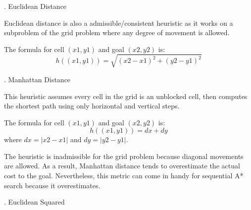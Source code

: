 \documentclass[12pt, letterpaper]{article}
\begin{document}
\bigskip
{}. Euclidean Distance

Euclidean distance is also a admissible/consistent heuristic as it works on a subproblem of the grid problem where any degree of movement is allowed.

The formula for cell $(x1, y1)$ and goal $(x2, y2)$ is:
$$h((x1,y1)) = \sqrt{(x2-x1)^2 + (y2-y1)^2}$$

\bigskip
{}. Manhattan Distance

This heuristic assumes every cell in the grid is an unblocked cell, then computes the shortest path using only horizontal and vertical steps.

The formula for cell $(x1, y1)$ and goal $(x2, y2)$ is:
$$h((x1, y1)) = dx + dy$$
where $dx = |x2 - x1|$ and $dy = |y2 - y1|$.

The heuristic is inadmissible for the grid problem because diagonal movements are allowed. As a result, Manhattan distance tends to overestimate the actual cost to the goal. Nevertheless, this metric can come in handy for sequential A* search because it overestimates.

\bigskip
{}. Euclidean Squared
\end{document}

